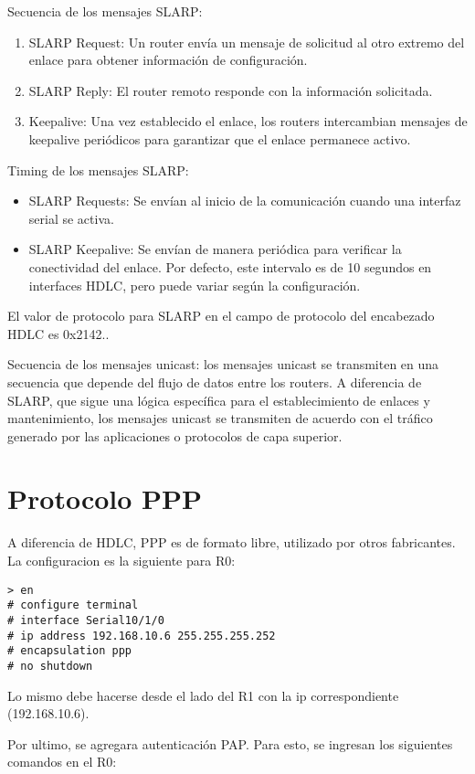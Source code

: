 \documentclass{article}
\begin{document}
Secuencia de los mensajes SLARP:
\begin{enumerate}
    \item SLARP Request: Un router envía un mensaje de solicitud al otro extremo del enlace para obtener información de configuración.
    \item SLARP Reply: El router remoto responde con la información solicitada.
    \item Keepalive: Una vez establecido el enlace, los routers intercambian mensajes de keepalive periódicos para garantizar que el enlace permanece activo.
\end{enumerate}

Timing de los mensajes SLARP:
\begin{itemize}
    \item SLARP Requests: Se envían al inicio de la comunicación cuando una interfaz serial se activa.
    \item SLARP Keepalive: Se envían de manera periódica para verificar la conectividad del enlace. Por defecto, este intervalo es de 10 segundos en interfaces HDLC, pero puede variar según la configuración.
\end{itemize}

El valor de protocolo para SLARP en el campo de protocolo del encabezado HDLC es 0x2142..

Secuencia de los mensajes unicast: los mensajes unicast se transmiten en una secuencia que depende del flujo de datos entre los routers. A diferencia de SLARP, que sigue una lógica específica para el establecimiento de enlaces y mantenimiento, los mensajes unicast se transmiten de acuerdo con el tráfico generado por las aplicaciones o protocolos de capa superior.


\section{Protocolo PPP}
A diferencia de HDLC, PPP es de formato libre, utilizado por otros fabricantes. La configuracion es la siguiente para R0:

\begin{verbatim}
> en
# configure terminal 
# interface Serial10/1/0 
# ip address 192.168.10.6 255.255.255.252
# encapsulation ppp
# no shutdown
\end{verbatim}

Lo mismo debe hacerse desde el lado del R1 con la ip correspondiente (192.168.10.6).

Por ultimo, se agregara autenticación PAP. Para esto, se ingresan los siguientes comandos en el R0:
\end{document}
